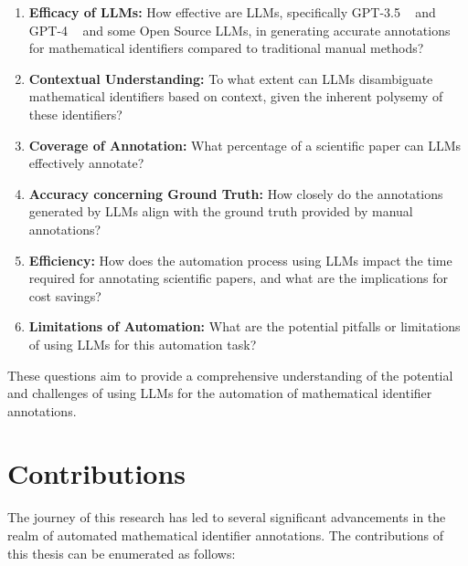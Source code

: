 \begin{enumerate}
    \item \textbf{Efficacy of LLMs:} How effective are LLMs, specifically GPT-3.5 ~\parencite{openai2023} and GPT-4 ~\parencite{2303.08774} and some Open Source LLMs, in generating accurate annotations for mathematical identifiers compared to traditional manual methods?
    
    \item \textbf{Contextual Understanding:} To what extent can LLMs disambiguate mathematical identifiers based on context, given the inherent polysemy of these identifiers?
    
    \item \textbf{Coverage of Annotation:} What percentage of a scientific paper can LLMs effectively annotate?
    
    \item \textbf{Accuracy concerning Ground Truth:} How closely do the annotations generated by LLMs align with the ground truth provided by manual annotations?
    
    \item \textbf{Efficiency:} How does the automation process using LLMs impact the time required for annotating scientific papers, and what are the implications for cost savings?
    
    \item \textbf{Limitations of Automation:} What are the potential pitfalls or limitations of using LLMs for this automation task?
\end{enumerate}

These questions aim to provide a comprehensive understanding of the potential and challenges of using LLMs for the automation of mathematical identifier annotations.

\section{Contributions}

The journey of this research has led to several significant advancements in the realm of automated mathematical identifier annotations. The contributions of this thesis can be enumerated as follows:

